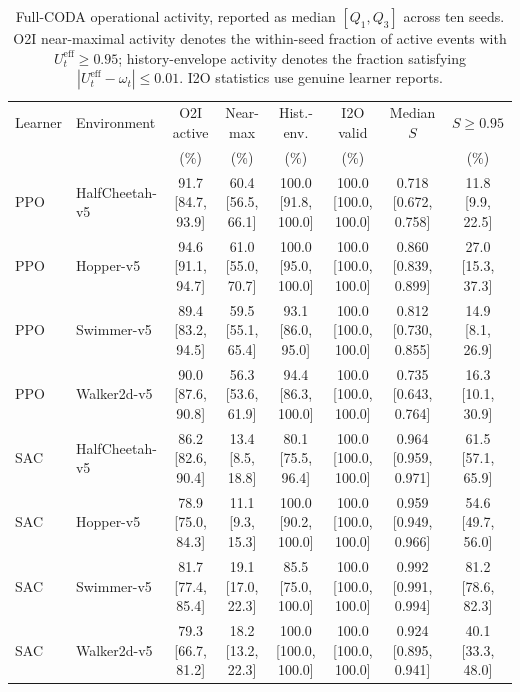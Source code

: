 \begin{table}[t]
\centering
\caption{Full-CODA operational activity, reported as median $[Q_1,Q_3]$ across ten seeds. O2I near-maximal activity denotes the within-seed fraction of active events with $U_t^{\mathrm{eff}}\geq0.95$; history-envelope activity denotes the fraction satisfying $|U_t^{\mathrm{eff}}-\omega_t|\leq0.01$. I2O statistics use genuine learner reports.}
\label{tab:channel_activity}
\setlength{\tabcolsep}{3.2pt}
\renewcommand{\arraystretch}{1.05}
\begin{tabular}{llcccccc}
\hline
Learner & Environment & O2I active & Near-max & Hist.-env. & I2O valid & Median $S$ & $S\geq0.95$ \\
 & & (\%) & (\%) & (\%) & (\%) & & (\%) \\
\hline
PPO & HalfCheetah-v5 & 91.7 [84.7, 93.9] & 60.4 [56.5, 66.1] & 100.0 [91.8, 100.0] & 100.0 [100.0, 100.0] & 0.718 [0.672, 0.758] & 11.8 [9.9, 22.5] \\
PPO & Hopper-v5 & 94.6 [91.1, 94.7] & 61.0 [55.0, 70.7] & 100.0 [95.0, 100.0] & 100.0 [100.0, 100.0] & 0.860 [0.839, 0.899] & 27.0 [15.3, 37.3] \\
PPO & Swimmer-v5 & 89.4 [83.2, 94.5] & 59.5 [55.1, 65.4] & 93.1 [86.0, 95.0] & 100.0 [100.0, 100.0] & 0.812 [0.730, 0.855] & 14.9 [8.1, 26.9] \\
PPO & Walker2d-v5 & 90.0 [87.6, 90.8] & 56.3 [53.6, 61.9] & 94.4 [86.3, 100.0] & 100.0 [100.0, 100.0] & 0.735 [0.643, 0.764] & 16.3 [10.1, 30.9] \\
SAC & HalfCheetah-v5 & 86.2 [82.6, 90.4] & 13.4 [8.5, 18.8] & 80.1 [75.5, 96.4] & 100.0 [100.0, 100.0] & 0.964 [0.959, 0.971] & 61.5 [57.1, 65.9] \\
SAC & Hopper-v5 & 78.9 [75.0, 84.3] & 11.1 [9.3, 15.3] & 100.0 [90.2, 100.0] & 100.0 [100.0, 100.0] & 0.959 [0.949, 0.966] & 54.6 [49.7, 56.0] \\
SAC & Swimmer-v5 & 81.7 [77.4, 85.4] & 19.1 [17.0, 22.3] & 85.5 [75.0, 100.0] & 100.0 [100.0, 100.0] & 0.992 [0.991, 0.994] & 81.2 [78.6, 82.3] \\
SAC & Walker2d-v5 & 79.3 [66.7, 81.2] & 18.2 [13.2, 22.3] & 100.0 [100.0, 100.0] & 100.0 [100.0, 100.0] & 0.924 [0.895, 0.941] & 40.1 [33.3, 48.0] \\
\hline
\end{tabular}
\end{table}